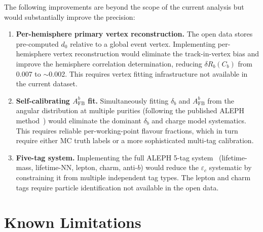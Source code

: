 \documentclass[11pt,a4paper]{article}
\begin{document}
The following improvements are beyond the scope of the current analysis
but would substantially improve the precision:

\begin{enumerate}
\item \textbf{Per-hemisphere primary vertex reconstruction.}
  The open data stores pre-computed $d_0$ relative to a global event
  vertex.  Implementing per-hemisphere vertex reconstruction would
  eliminate the track-in-vertex bias and improve the hemisphere
  correlation determination, reducing $\delta R_b(C_b)$ from 0.007
  to $\sim$0.002.  This requires vertex fitting infrastructure not
  available in the current dataset.

\item \textbf{Self-calibrating $A_\mathrm{FB}^b$ fit.}
  Simultaneously fitting $\delta_b$ and $A_\mathrm{FB}^b$ from the
  angular distribution at multiple purities (following the published
  ALEPH method~\cite{ALEPH:AFBb}) would eliminate the dominant
  $\delta_b$ and charge model systematics.  This requires reliable
  per-working-point flavour fractions, which in turn require either
  MC truth labels or a more sophisticated multi-tag calibration.

\item \textbf{Five-tag system.}
  Implementing the full ALEPH 5-tag system~\cite{ALEPH:Rb:1996}
  (lifetime-mass, lifetime-NN, lepton, charm, anti-$b$) would reduce
  the $\varepsilon_c$ systematic by constraining it from multiple
  independent tag types.  The lepton and charm tags require particle
  identification not available in the open data.
\end{enumerate}

\section{Known Limitations}
\label{sec:limitations}
\end{document}
